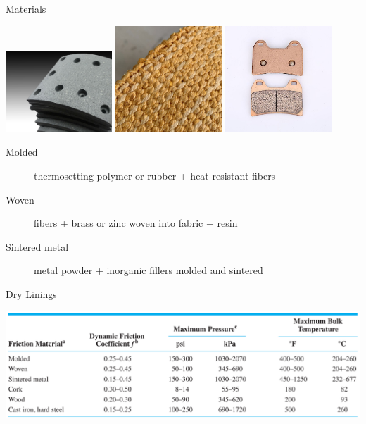 \documentclass[10pt, svgnames]{beamer}
\begin{document}
\begin{frame}[label={sec:org519880d}]{Materials}
\begin{center}
\includegraphics[width=0.3\textwidth]{./pictures/molded-lining.jpg}
\includegraphics[width=0.3\textwidth]{./pictures/woven-lining.jpg}
\includegraphics[width=0.3\textwidth]{./pictures/sintered-lining.jpg}
\end{center}

\begin{description}
\item[{Molded}] thermosetting polymer or rubber + heat resistant fibers
\item[{Woven}] fibers + brass or zinc woven into fabric + resin
\item[{Sintered metal}] metal powder + inorganic fillers molded and sintered
\end{description}
\end{frame}

\begin{frame}[label={sec:org18d079f}]{Dry Linings}
\begin{center}
\includegraphics[width=\textwidth]{./pictures/dry-materials.png}
\end{center}
\end{frame}
\end{document}

